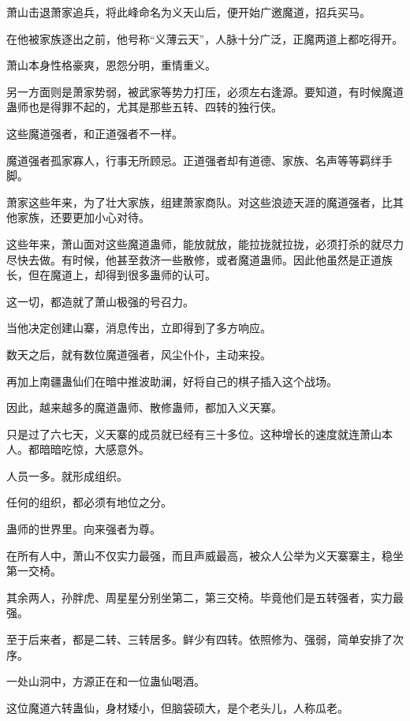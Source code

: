 
\begin{this_body}

萧山击退萧家追兵，将此峰命名为义天山后，便开始广邀魔道，招兵买马。

在他被家族逐出之前，他号称“义薄云天”，人脉十分广泛，正魔两道上都吃得开。

萧山本身性格豪爽，恩怨分明，重情重义。

另一方面则是萧家势弱，被武家等势力打压，必须左右逢源。要知道，有时候魔道蛊师也是得罪不起的，尤其是那些五转、四转的独行侠。

这些魔道强者，和正道强者不一样。

魔道强者孤家寡人，行事无所顾忌。正道强者却有道德、家族、名声等等羁绊手脚。

萧家这些年来，为了壮大家族，组建萧家商队。对这些浪迹天涯的魔道强者，比其他家族，还要更加小心对待。

这些年来，萧山面对这些魔道蛊师，能放就放，能拉拢就拉拢，必须打杀的就尽力尽快去做。有时候，他甚至救济一些散修，或者魔道蛊师。因此他虽然是正道族长，但在魔道上，却得到很多蛊师的认可。

这一切，都造就了萧山极强的号召力。

当他决定创建山寨，消息传出，立即得到了多方响应。

数天之后，就有数位魔道强者，风尘仆仆，主动来投。

再加上南疆蛊仙们在暗中推波助澜，好将自己的棋子插入这个战场。

因此，越来越多的魔道蛊师、散修蛊师，都加入义天寨。

只是过了六七天，义天寨的成员就已经有三十多位。这种增长的速度就连萧山本人。都暗暗吃惊，大感意外。

人员一多。就形成组织。

任何的组织，都必须有地位之分。

蛊师的世界里。向来强者为尊。

在所有人中，萧山不仅实力最强，而且声威最高，被众人公举为义天寨寨主，稳坐第一交椅。

其余两人，孙胖虎、周星星分别坐第二，第三交椅。毕竟他们是五转强者，实力最强。

至于后来者，都是二转、三转居多。鲜少有四转。依照修为、强弱，简单安排了次序。

一处山洞中，方源正在和一位蛊仙喝酒。

这位魔道六转蛊仙，身材矮小，但脑袋硕大，是个老头儿，人称瓜老。


\end{this_body}

